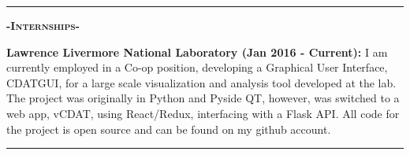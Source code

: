 \documentclass[12pt]{article}
\begin{document}
\noindent\rule{19cm}{0.4pt}


\begin{center}
\textbf{\textsc{-Internships-}}\\
\end{center}
\begin{footnotesize}

\flushleft
\color{Cerulean}\textbf{Lawrence Livermore National Laboratory (Jan 2016 - Current):} 
\color{Black}I am currently employed in a Co-op position, developing a Graphical User Interface, CDATGUI, for a large scale visualization and analysis tool developed at the lab. The project was originally in \color{TealBlue}Python and Pyside QT, \color{Black} however, was switched to a web app, vCDAT, using \color{TealBlue}React/Redux\color{Black}, interfacing with a \color{TealBlue}Flask \color{Black}API. All code for the project is open source and can be found on my github account.\\
\medskip
\end{footnotesize}

\noindent\rule{19cm}{0.4pt}
\end{document}
